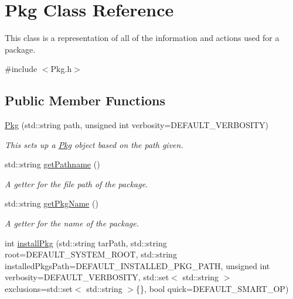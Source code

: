 \hypertarget{classPkg}{}\section{Pkg Class Reference}
\label{classPkg}


This class is a representation of all of the information and actions used for a package.  




{\ttfamily \#include $<$Pkg.\+h$>$}

\subsection*{Public Member Functions}
\begin{DoxyCompactItemize}
\item 
\mbox{\hyperlink{classPkg_ab1cb576aa221a08c9b84ce90aae71654}{Pkg}} (std\+::string path, unsigned int verbosity=D\+E\+F\+A\+U\+L\+T\+\_\+\+V\+E\+R\+B\+O\+S\+I\+TY)
\begin{DoxyCompactList}\small\item\em This sets up a \mbox{\hyperlink{classPkg}{Pkg}} object based on the path given. \end{DoxyCompactList}\item 
std\+::string \mbox{\hyperlink{classPkg_a6e2ea56742915496002b4c0625a6b410}{get\+Pathname}} ()
\begin{DoxyCompactList}\small\item\em A getter for the file path of the package. \end{DoxyCompactList}\item 
\mbox{\label{classPkg_ad16a1c92f78338f86f8fa84000dad84c}} 
std\+::string \mbox{\hyperlink{classPkg_ad16a1c92f78338f86f8fa84000dad84c}{get\+Pkg\+Name}} ()
\begin{DoxyCompactList}\small\item\em A getter for the name of the package. \end{DoxyCompactList}\item 
int \mbox{\hyperlink{classPkg_a3892025f27bebfeb07342f6b24284b88}{install\+Pkg}} (std\+::string tar\+Path, std\+::string root=D\+E\+F\+A\+U\+L\+T\+\_\+\+S\+Y\+S\+T\+E\+M\+\_\+\+R\+O\+OT, std\+::string installed\+Pkgs\+Path=D\+E\+F\+A\+U\+L\+T\+\_\+\+I\+N\+S\+T\+A\+L\+L\+E\+D\+\_\+\+P\+K\+G\+\_\+\+P\+A\+TH, unsigned int verbosity=D\+E\+F\+A\+U\+L\+T\+\_\+\+V\+E\+R\+B\+O\+S\+I\+TY, std\+::set$<$ std\+::string $>$ exclusions=std\+::set$<$ std\+::string $>$\{\}, bool quick=D\+E\+F\+A\+U\+L\+T\+\_\+\+S\+M\+A\+R\+T\+\_\+\+OP)

\end{DoxyCompactItemize}
